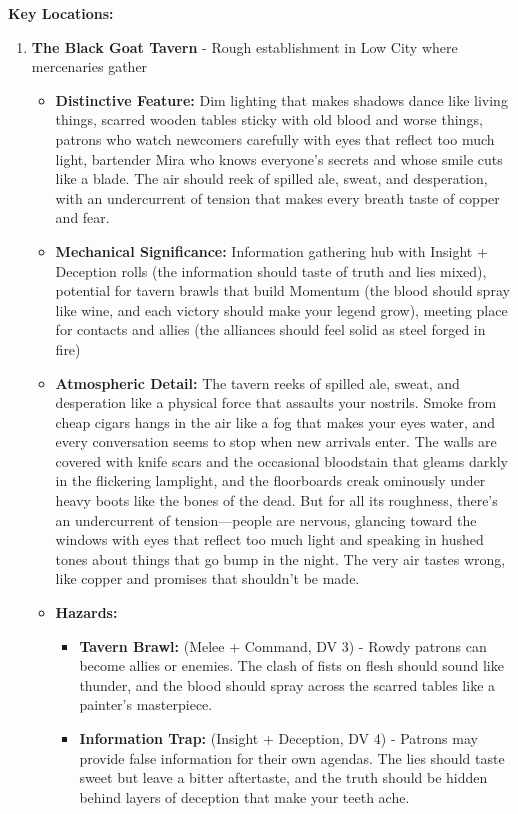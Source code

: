 \documentclass[11pt]{article}
\begin{document}
\textbf{Key Locations:}
\begin{enumerate}
\item \textbf{The Black Goat Tavern} - Rough establishment in Low City where mercenaries gather
  \begin{itemize}
  \item \textbf{Distinctive Feature:} Dim lighting that makes shadows dance like living things, scarred wooden tables sticky with old blood and worse things, patrons who watch newcomers carefully with eyes that reflect too much light, bartender Mira who knows everyone's secrets and whose smile cuts like a blade. The air should reek of spilled ale, sweat, and desperation, with an undercurrent of tension that makes every breath taste of copper and fear.
  \item \textbf{Mechanical Significance:} Information gathering hub with Insight + Deception rolls (the information should taste of truth and lies mixed), potential for tavern brawls that build Momentum (the blood should spray like wine, and each victory should make your legend grow), meeting place for contacts and allies (the alliances should feel solid as steel forged in fire)
  \item \textbf{Atmospheric Detail:} The tavern reeks of spilled ale, sweat, and desperation like a physical force that assaults your nostrils. Smoke from cheap cigars hangs in the air like a fog that makes your eyes water, and every conversation seems to stop when new arrivals enter. The walls are covered with knife scars and the occasional bloodstain that gleams darkly in the flickering lamplight, and the floorboards creak ominously under heavy boots like the bones of the dead. But for all its roughness, there's an undercurrent of tension—people are nervous, glancing toward the windows with eyes that reflect too much light and speaking in hushed tones about things that go bump in the night. The very air tastes wrong, like copper and promises that shouldn't be made.
  \item \textbf{Hazards:}
    \begin{itemize}
    \item \textbf{Tavern Brawl:} (Melee + Command, DV 3) - Rowdy patrons can become allies or enemies. The clash of fists on flesh should sound like thunder, and the blood should spray across the scarred tables like a painter's masterpiece.
    \item \textbf{Information Trap:} (Insight + Deception, DV 4) - Patrons may provide false information for their own agendas. The lies should taste sweet but leave a bitter aftertaste, and the truth should be hidden behind layers of deception that make your teeth ache.

\end{itemize}
\end{itemize}
\end{enumerate}
\end{document}

